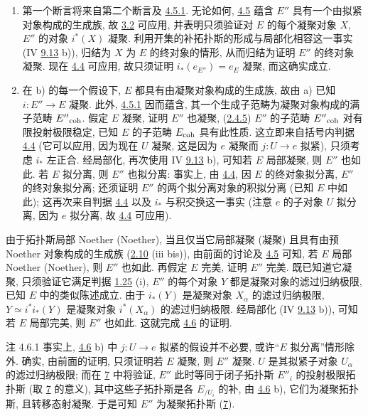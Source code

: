 \begin{enumerate}
\renewcommand{\theenumi}{\alph{enumi}}
\renewcommand{\labelenumi}{\theenumi)}
\item 第一个断言将来自第二个断言及 \hyperref[VI.lem4.5.1]{4.5.1}.
无论如何, \hyperref[VI.cor4.5]{4.5}
蕴含 $E''$ 具有一个由拟紧对象构成的生成族,
故 \hyperref[VI.prop3.2]{3.2} 可应用,
并表明只须验证对 $E$ 的每个凝聚对象 $X$,
$E''$ 的对象 $i^{\ast}(X)$ 凝聚.
利用开集的补拓扑斯的形成与局部化相容这一事实
(IV \hyperref[IV.cor9.4.3]{9.13} b)),
归结为 $X$ 为 $E$ 的终对象的情形,
从而归结为证明 $E''$ 的终对象凝聚.
现在 \hyperref[VI.cor4.4]{4.4} 可应用,
故只须证明 $i_{\ast}(e_{E''})=e_E$ 凝聚, 而这确实成立.

\item 在 b) 的每一个假设下,
$E$ 都具有由凝聚对象构成的生成族,
故由 a) 已知 $i:E''\to E$ 凝聚.
此外, \hyperref[VI.lem4.5.1]{4.5.1} 因而蕴含,
其一个生成子范畴为凝聚对象构成的满子范畴 ${E''}_{\mathrm{coh}}$.
假定 $E$ 凝聚, 证明 $E''$ 也凝聚,
\ie (\hyperref[VI.subsubsec2.4.5]{2.4.5})
$E''$ 的子范畴 ${E''}_{\mathrm{coh}}$ 对有限投射极限稳定,
已知 $E$ 的子范畴 $E_{\mathrm{coh}}$ 具有此性质.
这立即来自括号内判据 \hyperref[VI.cor4.4]{4.4}
(它可以应用, 因为现在 $U$ 凝聚,
这是因为 $e$\pageoriginale{} 凝聚而 $j:U\to e$ 拟紧),
只须考虑 $i_{\ast}$ 左正合.
经局部化, 再次使用 IV \hyperref[IV.cor9.4.3]{9.13} b),
可知若 $E$ 局部凝聚, 则 $E''$ 也如此.
若 $E$ 拟分离, 则 $E''$ 也拟分离:
事实上, 由 \hyperref[VI.cor4.4]{4.4},
因 $E$ 的终对象拟分离, $E''$ 的终对象拟分离;
还须证明 $E''$ 的两个拟分离对象的积拟分离
(已知 $E$ 中如此);
这再次来自判据 \hyperref[VI.cor4.4]{4.4}
以及 $i_{\ast}$ 与积交换这一事实
(注意 $e$ 的子对象 $U$ 拟分离, 因为 $e$ 拟分离,
故 \hyperref[VI.cor4.4]{4.4} 可应用).
\end{enumerate}

由于拓扑斯局部 Noether (\resp Noether),
当且仅当它局部凝聚 (\resp 凝聚)
且具有由预 Noether 对象构成的生成族
(\hyperref[VI.prop2.10]{2.10} (iii bis)),
由前面的讨论及 \hyperref[VI.cor4.5]{4.5} 可知,
若 $E$ 局部 Noether (\resp Noether), 则 $E''$ 也如此.
再假定 $E$ 完美, 证明 $E''$ 完美.
既已知道它凝聚,
只须验证它满足判据 \hyperref[VI.cor1.25]{1.25} (i),
\ie $E''$ 的每个对象 $Y$ 都是凝聚对象的滤过归纳极限,
已知 $E$ 中的类似陈述成立.
由于 $i_{\ast}(Y)$ 是凝聚对象 $X_{\alpha}$ 的滤过归纳极限,
$Y\simeq i^{\ast}i_{\ast}(Y)$
是凝聚对象 $i^{\ast}(X_{\alpha})$ 的滤过归纳极限.
经局部化 (IV \hyperref[IV.cor9.4.3]{9.13} b)),
可知若 $E$ 局部完美, 则 $E''$ 也如此.
这就完成 \hyperref[VI.prop4.6]{4.6} 的证明.

\begin{enonce*}[remark]{注 4.6.1}
事实上\pageoriginale{},
\hyperref[VI.prop4.6]{4.6} b) 中 $j:U\to e$ 拟紧的假设并不必要,
或许“$E$ 拟分离”情形除外.
确实, 由前面的证明,
只须证明若 $E$ 凝聚, 则 $E''$ 凝聚.
$U$ 是其拟紧子对象 $U_{\alpha}$ 的滤过归纳极限;
而在 \hyperref[VI.sec7]{7} 中将验证,
$E''$ 此时等同于闭子拓扑斯 $E''_i$ 的投射极限拓扑斯
(取 \hyperref[VI.sec7]{7} 的意义),
其中这些子拓扑斯是各 $E_{/U_i}$ 的补,
由 \hyperref[VI.prop4.6]{4.6} b),
它们为凝聚拓扑斯, 且转移态射凝聚.
于是可知 $E''$ 为凝聚拓扑斯 (\hyperref[VI.sec7]{7}).
\end{enonce*}

